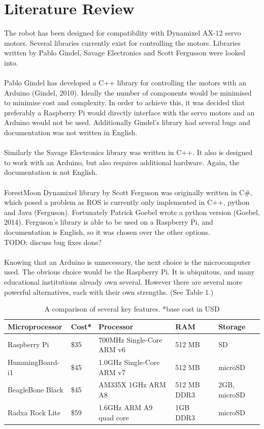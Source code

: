 \documentclass[]{article}
\begin{document}
\section{Literature Review}

The robot has been designed for compatibility with Dynamixel AX-12 servo motors. Several libraries currently exist for controlling the motors. Libraries written by Pablo Gindel, Savage Electronics and Scott Fergusson were looked into.
\\
\\
Pablo Gindel has developed a C++ library for controlling the motors with an Arduino (Gindel, 2010). Ideally the number of components would be minimised to minimise cost and complexity. In order to achieve this, it was decided that preferably a Raspberry Pi would directly interface with the servo motors and an Arduino would not be used. Additionally Gindel's library had several bugs and documentation was not written in English.
\\
\\
Similarly the Savage Electronics library was written in C++. It also is designed to work with an Arduino, but also requires additional hardware. Again, the documentation is not English.
\\
\\
ForestMoon Dynamixel library by Scott Ferguson was originally written in C\#, which posed a problem as ROS is currently only implemented in C++, python and Java (Ferguson). Fortunately Patrick Goebel wrote a python version (Goebel, 2014). Ferguson's library is able to be used on a Raspberry Pi, and documentation is English, so it was chosen over the other options.
\\
TODO: discuss bug fixes done?
\\
\\
Knowing that an Arduino is unnecessary, the next choice is the microcomputer used. The obvious choice would be the Raspberry Pi. It is ubiquitous, and many educational institutions already own several. However there are several more powerful alternatives, each with their own strengths. (See Table 1.)
\\


\begin{table}[h]
\centering
\begin{tabular}[c]{l l p{2.5cm} l p{1.7cm}}
Microprocessor   & Cost* & Processor                             & RAM             & Storage                    \\
\hline
Raspberry Pi     & \$35      & 700MHz Single-Core ARM v6             & 512 MB      & SD                         \\
HummingBoard-i1  & \$45      & 1.0GHz Single-Core ARM v7             & 512 MB      &             microSD               \\
BeagleBone Black & \$45      & AM335X 1GHz ARM A8             & 512 MB DDR3 & 2GB, microSD \\
Radxa Rock Lite  & \$59      & 1.6GHz  ARM A9 quad core & 1GB DDR3           & microSD                   
\end{tabular}
\caption{A comparison of several key features. *base cost in USD}
\end{table}
\end{document}

